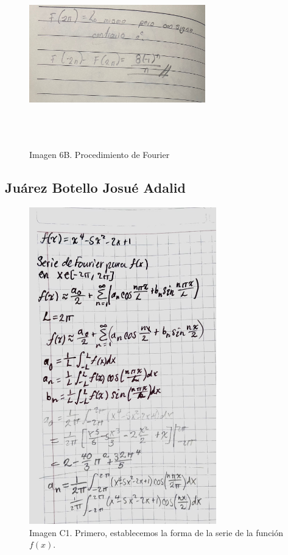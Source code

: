 \begin{figure}[H]
	\centering
	\includegraphics[width=3.00684in,height=3.1593in]{media/image46.jpg}
	\caption{Imagen 6B. Procedimiento de Fourier}
\end{figure}

\subsection{Juárez Botello Josué Adalid}

\begin{figure}[H]
	\centering
	\includegraphics[width=3.19696in,height=5.41146in]{media/image44.jpg}
	\caption{Imagen C1. Primero, establecemos la forma de la serie de la función \(f(x)\).}
\end{figure}

